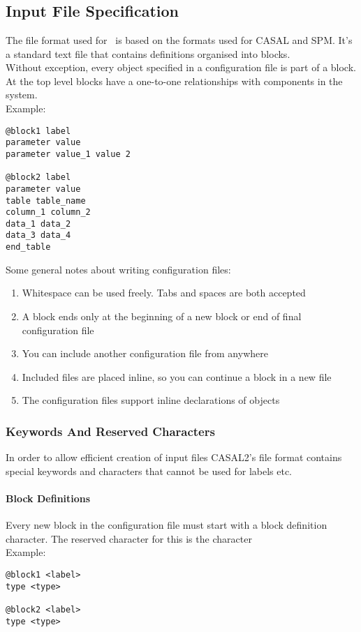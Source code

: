 
\section{\label{sec:examples}}

\subsection{Input File Specification}
The file format used for \CNAME\ is based on the formats used for CASAL and SPM. It's a standard text file that contains definitions organised into blocks.
\\
Without exception, every object specified in a configuration file is part of a block. At the top level blocks have a one-to-one relationships with components in the system.
\\
Example:
\\
{\small{\begin{verbatim}
@block1 label
parameter value
parameter value_1 value 2

@block2 label
parameter value
table table_name
column_1 column_2
data_1 data_2
data_3 data_4
end_table
\end{verbatim}}}

Some general notes about writing configuration files:
\begin{enumerate}
	\item Whitespace can be used freely. Tabs and spaces are both accepted
	\item A block ends only at the beginning of a new block or end of final configuration file
	\item You can include another configuration file from anywhere
	\item Included files are placed inline, so you can continue a block in a new file
	\item The configuration files support inline declarations of objects
\end{enumerate}

\subsubsection{Keywords And Reserved Characters}
In order to allow efficient creation of input files CASAL2's file format contains special keywords and characters that cannot be used for labels etc.

\paragraph*{\command Block Definitions}
Every new block in the configuration file must start with a block definition character. The reserved character for this is the \command character\\
Example:
{\small{\begin{verbatim}
@block1 <label>
type <type>

@block2 <label>
type <type>
\end{verbatim}}}

